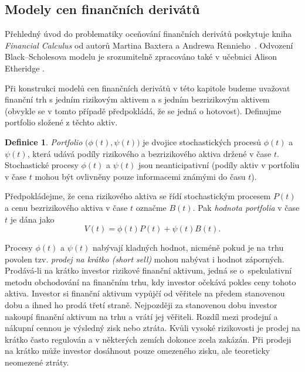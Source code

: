 \documentclass[a4paper,12pt]{report}
\theoremstyle{definition} \newtheorem{definice}[veta]{Definice}
\theoremstyle{remark}
\begin{document}
\subsection{Modely cen finančních derivátů}
Přehledný úvod do problematiky oceňování finančních derivátů poskytuje kniha \textit{Financial Calculus} od autorů Martina Baxtera a Andrewa Rennieho~\cite{baxter1996financial}.
Odvození Black–Scholesova modelu je srozumitelně zpracováno také v učebnici Alison Etheridge \cite{etheridge2002course}.

Při konstrukci modelů cen finančních derivátů v této kapitole budeme uvažovat finanční trh s jedním rizikovým aktivem a s jedním bezrizikovým aktivem (obvykle se v tomto případě předpokládá, že se jedná o hotovost).
Definujme portfolio složené z těchto aktiv.
\begin{definice}
\textit{Portfolio} $\big(\phi(t),\psi(t)\big)$ je dvojice stochastických procesů $\phi(t)$ a $\psi(t)$, která udává podíly rizikového a bezrizikového aktiva držené v čase $t$.
Stochastické procesy  $\phi(t)$ a $\psi(t)$ jsou neanticipativní (podíly aktiv v portfoliu v čase $t$ mohou být ovlivněny pouze informacemi známými do času $t$).

Předpokládejme, že cena rizikového aktiva se řídí stochastickým procesem $P(t)$ a cenu bezrizikového aktiva v čase $t$ označme $B(t)$.
Pak \textit{hodnota portfolia} v čase $t$ je dána jako
\begin{equation}\label{hodnota_portfolia}
V(t)=\phi(t)P(t)+\psi(t)B(t).
\end{equation}
\end{definice}

Procesy $\phi(t)$ a $\psi(t)$ nabývají kladných hodnot, nicméně pokud je na trhu povolen tzv. \textit{prodej na krátko (short sell)} mohou nabývat i hodnot záporných.
Prodává-li na krátko investor rizikové finanční aktivum, jedná se o~spekulativní metodu obchodování na finančním trhu, kdy investor očekává pokles ceny tohoto aktiva.
Investor si finanční aktivum vypůjčí od věřitele na předem stanovenou dobu a ihned ho prodá třetí straně.
Nejpozději za stanovenou dobu investor nakoupí finanční aktivum na trhu a vrátí jej věřiteli.
Rozdíl mezi prodejní a nákupní cennou je výsledný zisk nebo ztráta.
Kvůli vysoké rizikovosti je prodej na krátko často regulován a v některých zemích dokonce zcela zakázán.
Při prodeji na krátko může investor dosáhnout pouze omezeného zisku, ale teoreticky neomezené ztráty.
\end{document}
